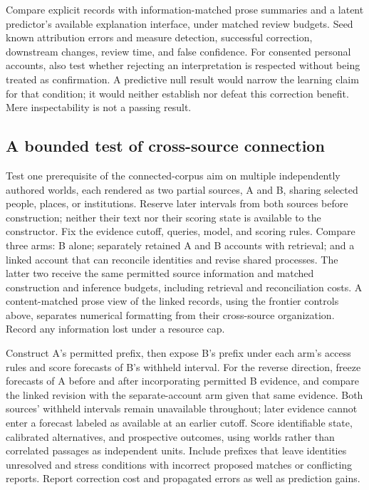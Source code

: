 \documentclass[10pt]{article}
\begin{document}
Compare explicit records with information-matched prose
summaries and a latent predictor's available explanation interface, under
matched review budgets. Seed known attribution errors and measure detection,
successful correction, downstream changes, review time, and false confidence.
For consented personal accounts, also test whether rejecting an interpretation
is respected without being treated as confirmation. A predictive null result
would narrow the learning claim for that condition; it would neither establish
nor defeat this correction benefit. Mere inspectability is not a passing result.

\subsection{A bounded test of cross-source connection}
\label{sec:cross-source-test}

Test one prerequisite of the connected-corpus aim on multiple independently
authored worlds, each rendered as two partial sources, A and B, sharing selected
people, places, or institutions. Reserve later intervals from both sources
before construction; neither their text nor their scoring state is available
to the constructor. Fix the evidence cutoff, queries, model, and scoring rules.
Compare three arms: B alone; separately retained A and B accounts with
retrieval; and a linked account that can reconcile identities and revise
shared processes. The latter two receive the same permitted source information
and matched construction and inference budgets, including retrieval and
reconciliation costs. A content-matched prose view of the linked records,
using the frontier controls above, separates numerical formatting from their
cross-source organization. Record any information lost under a resource cap.

Construct A's permitted prefix, then expose B's prefix under each arm's access
rules and score forecasts of B's withheld interval. For the reverse direction,
freeze forecasts of A before and after incorporating permitted B evidence,
and compare the linked revision with the separate-account arm given that same
evidence. Both sources' withheld intervals remain unavailable throughout;
later evidence cannot enter a forecast labeled as available at an earlier
cutoff. Score identifiable state, calibrated alternatives, and prospective
outcomes, using worlds rather than correlated passages as independent units.
Include prefixes that leave identities unresolved and stress conditions with
incorrect proposed matches or conflicting reports. Report correction cost and
propagated errors as well as prediction gains.
\end{document}
